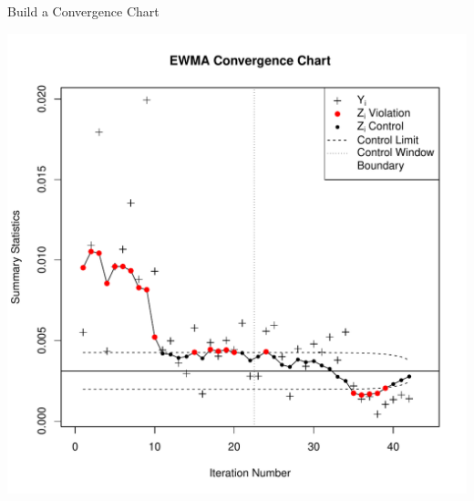 \documentclass[ xcolor = pdftex, dvipsnames, table ]{beamer}
\begin{document}
\subsection{}
\begin{frame}{Build a Convergence Chart}
\begin{center}
\vspace{-0.5cm}
\includegraphics[height=0.9\textheight]{exampleEWMAM.pdf}
\end{center}
\end{frame}
\end{document}
